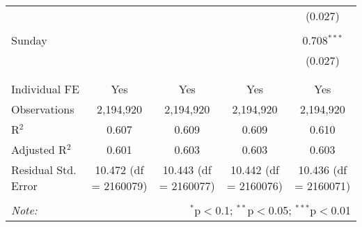 \documentclass[
]{article}
\begin{document}
\begin{table}[!htbp]
{\begin{tabular}{@{\extracolsep{5pt}}lcccc}
  &  &  &  & (0.027) \\ 
  & & & & \\ 
 Sunday &  &  &  & 0.708$^{***}$ \\ 
  &  &  &  & (0.027) \\ 
  & & & & \\ 
\hline \\[-1.8ex] 
Individual FE & Yes & Yes & Yes & Yes \\ 
Observations & 2,194,920 & 2,194,920 & 2,194,920 & 2,194,920 \\ 
R$^{2}$ & 0.607 & 0.609 & 0.609 & 0.610 \\ 
Adjusted R$^{2}$ & 0.601 & 0.603 & 0.603 & 0.603 \\ 
Residual Std. Error & 10.472 (df = 2160079) & 10.443 (df = 2160077) & 10.442 (df = 2160076) & 10.436 (df = 2160071) \\ 
\hline 
\hline \\[-1.8ex] 
\textit{Note:}  & \multicolumn{4}{r}{$^{*}$p$<$0.1; $^{**}$p$<$0.05; $^{***}$p$<$0.01} \\ 
\end{tabular}
} 
\end{table} 
\newpage
\end{document}

